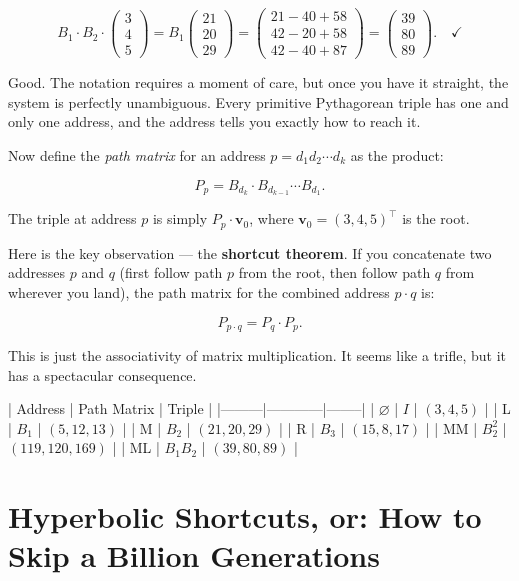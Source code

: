 \documentclass[11pt,twoside,openright]{book}
\theoremstyle{definition}
\theoremstyle{remark}
\begin{document}
\[B_1 \cdot B_2 \cdot \begin{pmatrix} 3 \\ 4 \\ 5 \end{pmatrix} = B_1 \begin{pmatrix} 21 \\ 20 \\ 29 \end{pmatrix} = \begin{pmatrix} 21 - 40 + 58 \\ 42 - 20 + 58 \\ 42 - 40 + 87 \end{pmatrix} = \begin{pmatrix} 39 \\ 80 \\ 89 \end{pmatrix}. \quad \checkmark\]

Good. The notation requires a moment of care, but once you have it straight, the system is perfectly unambiguous. Every primitive Pythagorean triple has one and only one address, and the address tells you exactly how to reach it.

Now define the \textit{path matrix} for an address $p = d_1 d_2 \cdots d_k$ as the product:

\[P_p = B_{d_k} \cdot B_{d_{k-1}} \cdots B_{d_1}.\]

The triple at address $p$ is simply $P_p \cdot \mathbf{v}_0$, where $\mathbf{v}_0 = (3, 4, 5)^\top$ is the root.

Here is the key observation --- the \textbf{shortcut theorem}. If you concatenate two addresses $p$ and $q$ (first follow path $p$ from the root, then follow path $q$ from wherever you land), the path matrix for the combined address $p \cdot q$ is:

\[P_{p \cdot q} = P_q \cdot P_p.\]

This is just the associativity of matrix multiplication. It seems like a trifle, but it has a spectacular consequence.

| Address | Path Matrix | Triple |
|---------|------------|--------|
| $\varnothing$ | $I$ | $(3, 4, 5)$ |
| L | $B_1$ | $(5, 12, 13)$ |
| M | $B_2$ | $(21, 20, 29)$ |
| R | $B_3$ | $(15, 8, 17)$ |
| MM | $B_2^2$ | $(119, 120, 169)$ |
| ML | $B_1 B_2$ | $(39, 80, 89)$ |



\section{Hyperbolic Shortcuts, or: How to Skip a Billion Generations}
\end{document}
